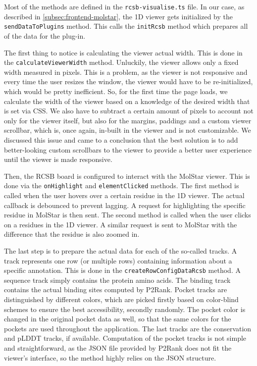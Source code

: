 Most of the methods are defined in the \texttt{rcsb-visualise.ts} file. In our case, as described in \cref{subsec:frontend-molstar}, the 1D viewer gets initialized by the \texttt{sendDataToPlugins} method. This calls the \texttt{initRcsb} method which prepares all of the data for the plug-in.

The first thing to notice is calculating the viewer actual width. This is done in the \texttt{calculateViewerWidth} method. Unluckily, the viewer allows only a fixed width measured in pixels. This is a problem, as the viewer is not responsive and every time the user resizes the window, the viewer would have to be re-initialized, which would be pretty inefficient. So, for the first time the page loads, we calculate the width of the viewer based on a knowledge of the desired width that is set via CSS. We also have to subtract a certain amount of pixels to account not only for the viewer itself, but also for the margins, paddings and a custom viewer scrollbar, which is, once again, in-built in the viewer and is not customizable. We discussed this issue and came to a conclusion that the best solution is to add better-looking custom scrollbars to the viewer to provide a better user experience until the viewer is made responsive.

Then, the RCSB board is configured to interact with the MolStar viewer. This is done via the \texttt{onHighlight} and \texttt{elementClicked} methods. The first method is called when the user hovers over a certain residue in the 1D viewer. The actual callback is debounced to prevent lagging. A request for highlighting the specific residue in MolStar is then sent. The second method is called when the user clicks on a residues in the 1D viewer. A similar request is sent to MolStar with the difference that the residue is also zoomed in.

The last step is to prepare the actual data for each of the so-called tracks. A track represents one row (or multiple rows) containing information about a specific annotation. This is done in the \texttt{createRowConfigDataRcsb} method. A sequence track simply contains the protein amino acids. The binding track contains the actual binding sites computed by P2Rank. Pocket tracks are distinguished by different colors, which are picked firstly based on color-blind schemes to ensure the best accessibility, secondly randomly. The pocket color is changed in the original pocket data as well, so that the same colors for the pockets are used throughout the application. The last tracks are the conservation and pLDDT tracks, if available. Computation of the pocket tracks is not simple and straightforward, as the JSON file provided by P2Rank does not fit the viewer's interface, so the method highly relies on the JSON structure.

